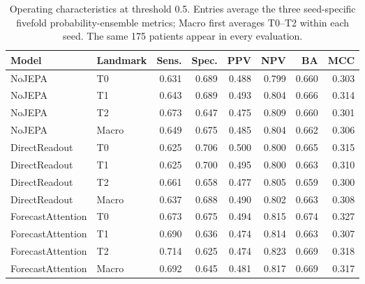 \begin{table}[t]
\centering
\small
\caption{Operating characteristics at threshold 0.5. Entries average the three seed-specific fivefold probability-ensemble metrics; Macro first averages T0--T2 within each seed. The same 175 patients appear in every evaluation.}
\label{tab:extended_operating}
\begin{tabular}{llrrrrrr}
\toprule
Model & Landmark & Sens. & Spec. & PPV & NPV & BA & MCC \\
\midrule
NoJEPA & T0 & 0.631 & 0.689 & 0.488 & 0.799 & 0.660 & 0.303 \\
NoJEPA & T1 & 0.643 & 0.689 & 0.493 & 0.804 & 0.666 & 0.314 \\
NoJEPA & T2 & 0.673 & 0.647 & 0.475 & 0.809 & 0.660 & 0.301 \\
NoJEPA & Macro & 0.649 & 0.675 & 0.485 & 0.804 & 0.662 & 0.306 \\
\midrule
DirectReadout & T0 & 0.625 & 0.706 & 0.500 & 0.800 & 0.665 & 0.315 \\
DirectReadout & T1 & 0.625 & 0.700 & 0.495 & 0.800 & 0.663 & 0.310 \\
DirectReadout & T2 & 0.661 & 0.658 & 0.477 & 0.805 & 0.659 & 0.300 \\
DirectReadout & Macro & 0.637 & 0.688 & 0.490 & 0.802 & 0.663 & 0.308 \\
\midrule
ForecastAttention & T0 & 0.673 & 0.675 & 0.494 & 0.815 & 0.674 & 0.327 \\
ForecastAttention & T1 & 0.690 & 0.636 & 0.474 & 0.814 & 0.663 & 0.307 \\
ForecastAttention & T2 & 0.714 & 0.625 & 0.474 & 0.823 & 0.669 & 0.318 \\
ForecastAttention & Macro & 0.692 & 0.645 & 0.481 & 0.817 & 0.669 & 0.317 \\
\bottomrule
\end{tabular}
\end{table}
